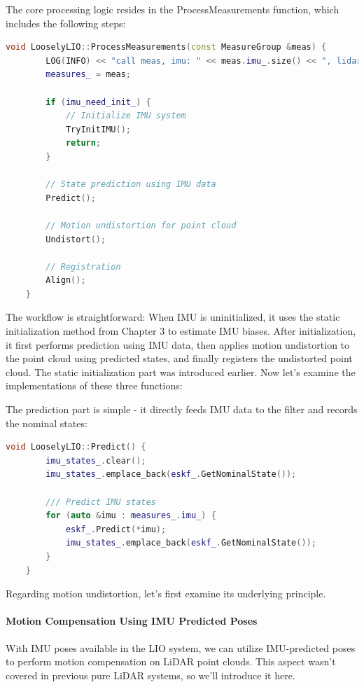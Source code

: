 The core processing logic resides in the ProcessMeasurements function, which includes the following steps:

\begin{lstlisting}[language=c++,caption=src/ch7/loosely_coupled_lio/loosly_lio.cc]
	void LooselyLIO::ProcessMeasurements(const MeasureGroup &meas) {
		LOG(INFO) << "call meas, imu: " << meas.imu_.size() << ", lidar pts: " << meas.lidar_->size();
		measures_ = meas;
		
		if (imu_need_init_) {
			// Initialize IMU system
			TryInitIMU();
			return;
		}
		
		// State prediction using IMU data
		Predict();
		
		// Motion undistortion for point cloud
		Undistort();
		
		// Registration
		Align();
	}
\end{lstlisting}

The workflow is straightforward: When IMU is uninitialized, it uses the static initialization method from Chapter 3 to estimate IMU biases. After initialization, it first performs prediction using IMU data, then applies motion undistortion to the point cloud using predicted states, and finally registers the undistorted point cloud. The static initialization part was introduced earlier. Now let's examine the implementations of these three functions:

The prediction part is simple - it directly feeds IMU data to the filter and records the nominal states:

\begin{lstlisting}[language=c++,caption=src/ch7/loosely_coupled_lio/loosly_lio.cc]
	void LooselyLIO::Predict() {
		imu_states_.clear();
		imu_states_.emplace_back(eskf_.GetNominalState());
		
		/// Predict IMU states
		for (auto &imu : measures_.imu_) {
			eskf_.Predict(*imu);
			imu_states_.emplace_back(eskf_.GetNominalState());
		}
	}
\end{lstlisting}

Regarding motion undistortion, let's first examine its underlying principle.

\paragraph{Motion Compensation Using IMU Predicted Poses}
\label{sec:motion-compensation}
With IMU poses available in the LIO system, we can utilize IMU-predicted poses to perform motion compensation on LiDAR point clouds. This aspect wasn't covered in previous pure LiDAR systems, so we'll introduce it here.

